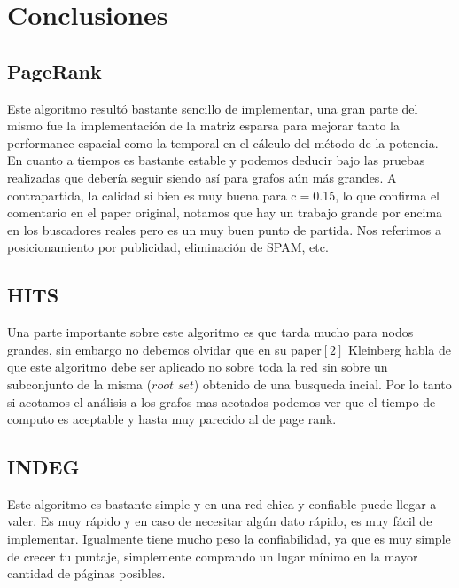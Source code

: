 
\section{Conclusiones}

\subsection{PageRank}
Este algoritmo resultó bastante sencillo de implementar, una gran parte del mismo fue la implementación de la matriz esparsa para mejorar tanto la performance espacial como la temporal en el cálculo del método de la potencia. \\
En cuanto a tiempos es bastante estable y podemos deducir bajo las pruebas realizadas que debería seguir siendo así para grafos aún más grandes. A contrapartida, la calidad si bien es muy buena para c$=$0.15, lo que confirma el comentario en el paper original, notamos que hay un trabajo grande por encima en los buscadores reales pero es un muy buen punto de partida. Nos referimos a posicionamiento por publicidad, eliminación de SPAM, etc.

\subsection{HITS}

Una parte importante sobre este algoritmo es que tarda mucho para nodos grandes, sin embargo no debemos olvidar que en su paper$[2]$ Kleinberg habla de que este algoritmo debe ser aplicado no sobre toda la red sin sobre un subconjunto de la misma ($\textit{root set}$) obtenido de una busqueda incial. Por lo tanto si acotamos el análisis a los grafos mas acotados podemos ver que el tiempo de computo es aceptable y hasta muy parecido al de page rank. 

\subsection{INDEG}

Este algoritmo es bastante simple y en una red chica y confiable puede llegar a valer. Es muy rápido y en caso de necesitar algún dato rápido, es muy fácil de implementar. Igualmente tiene mucho peso la confiabilidad, ya que es muy simple de crecer tu puntaje, simplemente comprando un lugar mínimo en la mayor cantidad de páginas posibles.


